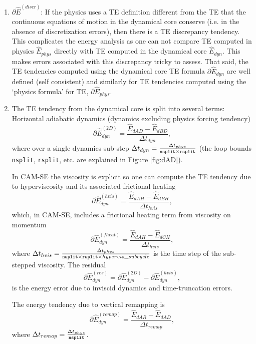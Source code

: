 \documentclass[draft,linenumbers]{agujournal}
\newcommand*{\gi}[1]{\widehat{#1}}
\begin{document}
\begin{enumerate}
\item $\partial \gi{E}^{({discr})}$: If the physics uses a TE definition different from the TE that the continuous equations of motion in the dynamical core conserve (i.e. in the absence of discretization errors), then there is a TE discrepancy tendency. This complicates the energy analysis as one can not compare TE computed in physics $\gi{E}_{phys}$ directly with TE computed in the dynamical core $\gi{E}_{dyn}$. This makes errors associated with this discrepancy tricky to assess. That said, the TE tendencies computed using the dynamical core TE formula $\partial \gi{E}_{dyn}$ are well defined (self consistent) and similarly for TE tendencies computed using the `physics formula' for TE, $\partial \gi{E}_{phys}$.


\item The TE tendency from the dynamical core is split into several terms:
Horizontal adiabatic dynamics (dynamics excluding physics forcing tendency)
\begin{equation}
\partial \gi{E}_{dyn}^{({2D})}=\frac{\gi{E}_{dAD}-\gi{E}_{dBD}}{\Delta t_{dyn}},
\end{equation}
where over a single dynamics sub-step $\Delta t_{dyn}=\frac{\Delta t_{phys}}{{\tt{nsplit}}\times {\tt{rsplit}}}$ (the loop bounds {\tt{nsplit}}, {\tt{rsplit}}, etc. are explained in Figure \ref{fig:dAD}).

In CAM-SE the viscosity is explicit so one can compute the TE tendency due to hyperviscosity and its associated frictional heating
\begin{equation}
\partial \gi{E}_{dyn}^{({hvis})}=\frac{\gi{E}_{dAH}-\gi{E}_{dBH}}{\Delta t_{hvis}},
\end{equation}
which, in CAM-SE, includes a frictional heating term from viscosity on momentum
\begin{equation}
\partial \gi{E}_{dyn}^{({fheat})}=\frac{\gi{E}_{dAH}-\gi{E}_{dCH}}{\Delta t_{hvis}},
\end{equation}
where $\Delta t_{hvis}=\frac{\Delta t_{phys}}{{\tt{nsplit}}\times {\tt{rsplit}} \times hypervis\_subcycle}$ is the time step of the sub-stepped viscosity. The residual
\begin{equation}
\partial \gi{E}_{dyn}^{(res)}=\partial \gi{E}_{dyn}^{({2D})}-\partial \gi{E}_{dyn}^{({hvis})},
\end{equation}
is the energy error due to inviscid dynamics and time-truncation errors.

The energy tendency due to vertical remapping is
\begin{equation}
\partial \gi{E}_{dyn}^{({remap})}=\frac{\gi{E}_{dAR}-\gi{E}_{dAD}}{\Delta t_{remap}},
\end{equation}
where $\Delta t_{remap}=\frac{\Delta t_{phys}}{{\tt{nsplit}}}$.


\end{enumerate}
\end{document}
